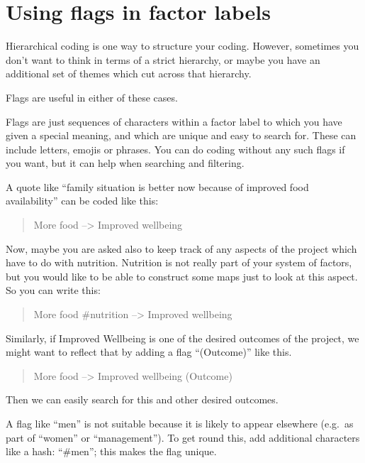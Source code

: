 \documentclass[
]{book}
\begin{document}
\hypertarget{using-flags-in-factor-labels}{%
\section{Using flags in factor labels}\label{using-flags-in-factor-labels}}

Hierarchical coding is one way to structure your coding. However, sometimes you don't want to think in terms of a strict hierarchy, or maybe you have an additional set of themes which cut across that hierarchy.

Flags are useful in either of these cases.

Flags are just sequences of characters within a factor label to which you have given a special meaning, and which are unique and easy to search for. These can include letters, emojis or phrases. You can do coding without any such flags if you want, but it can help when searching and filtering.

A quote like ``family situation is better now because of improved food availability'' can be coded like this:

\begin{quote}
More food --\textgreater{} Improved wellbeing
\end{quote}

Now, maybe you are asked also to keep track of any aspects of the project which have to do with nutrition. Nutrition is not really part of your system of factors, but you would like to be able to construct some maps just to look at this aspect. So you can write this:

\begin{quote}
More food \#nutrition --\textgreater{} Improved wellbeing
\end{quote}

Similarly, if Improved Wellbeing is one of the desired outcomes of the project, we might want to reflect that by adding a flag ``(Outcome)'' like this.

\begin{quote}
More food --\textgreater{} Improved wellbeing (Outcome)
\end{quote}

Then we can easily search for this and other desired outcomes.

A flag like ``men'' is not suitable because it is likely to appear elsewhere (e.g.~as part of ``women'' or ``management''). To get round this, add additional characters like a hash: ``\#men''; this makes the flag unique.
\end{document}

